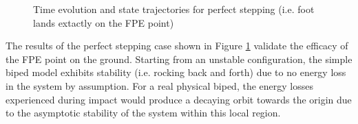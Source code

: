 \begin{figure}[!h]
	\begin{center}
	\end{center}
  	\caption{Time evolution and state trajectories for perfect stepping (i.e. foot lands extactly on the FPE point)}
	\label{sim:perfect}
\end{figure}

The results of the perfect stepping case shown in Figure \ref{sim:perfect} validate the efficacy of the FPE point on the ground. Starting from an unstable configuration, the simple biped model exhibits stability (i.e. rocking back and forth) due to no energy loss in the system by assumption. For a real physical biped, the energy losses experienced during impact would produce a decaying orbit towards the origin due to the asymptotic stability of the system within this local region. 

